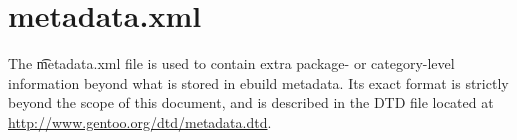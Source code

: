 \appendix

\chapter{metadata.xml}
\label{metadata-xml}

The \t{metadata.xml} file is used to contain extra package- or category-level information beyond
what is stored in ebuild metadata. Its exact format is strictly beyond the scope of this document,
and is described in the DTD file located at \url{http://www.gentoo.org/dtd/metadata.dtd}.


